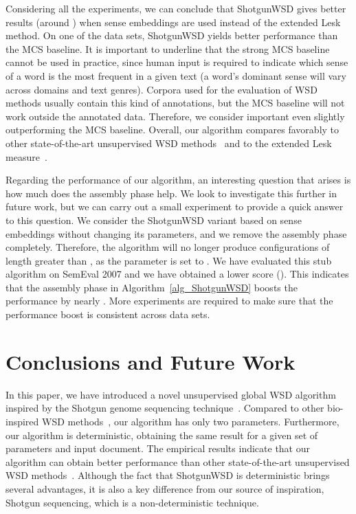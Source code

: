 \documentclass[11pt]{article}
\begin{document}
Considering all the experiments, we can conclude that ShotgunWSD gives better results (around ) when sense embeddings are used instead of the extended Lesk method. On one of the data sets, ShotgunWSD yields better performance than the MCS baseline. It is important to underline that the strong MCS baseline cannot be used in practice, since human input is required to indicate which sense of a word is the most frequent in a given text (a word's dominant sense will vary across domains and text genres). Corpora used for the evaluation of WSD methods usually contain this kind of annotations, but the MCS baseline will not work outside the annotated data. Therefore, we consider important even slightly outperforming the MCS baseline. Overall, our algorithm compares favorably to other state-of-the-art unsupervised WSD methods~\cite{Schwab-WET-2013,Chen-EMNLP-2014,Bhingardive-NAACL-2015} and to the extended Lesk measure~\cite{Banerjee-CICLING-2002,Torres-Lesk-2009}.

Regarding the performance of our algorithm, an interesting question that arises is how much does the assembly phase help. We look to investigate this further in future work, but we can carry out a small experiment to provide a quick answer to this question. We consider the ShotgunWSD variant based on sense embeddings without changing its parameters, and we remove the assembly phase completely. Therefore, the algorithm will no longer produce configurations of length greater than , as the parameter  is set to . We have evaluated this stub algorithm on SemEval 2007 and we have obtained a lower  score (). This indicates that the assembly phase in Algorithm~\ref{alg_ShotgunWSD} boosts the performance by nearly . More experiments are required to make sure that the performance boost is consistent across data sets.

\section{Conclusions and Future Work}
\label{sec_Conclusions}

In this paper, we have introduced a novel unsupervised global WSD algorithm inspired by the Shotgun genome sequencing technique~\cite{Shotgun-1981}. Compared to other bio-inspired WSD methods~\cite{Schwab-COLING-2012,Schwab-WET-2013}, our algorithm has only two parameters. Furthermore, our algorithm is deterministic, obtaining the same result for a given set of parameters and input document. The empirical results indicate that our algorithm can obtain better performance than other state-of-the-art unsupervised WSD methods~\cite{Schwab-WET-2013,Chen-EMNLP-2014,Bhingardive-NAACL-2015}. Although the fact that ShotgunWSD is deterministic brings several advantages, it is also a key difference from our source of inspiration, Shotgun sequencing, which is a non-deterministic technique.
\end{document}
